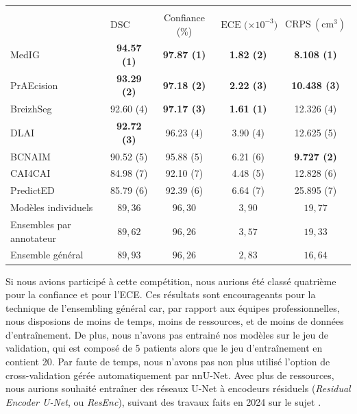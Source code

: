 \documentclass[a4paper,french,bookmarks,12pt]{article}
\begin{document}
    \begin{center}
        \footnotesize
        \begin{NiceTabular}{@{}l c c c c@{}}
        \toprule
         &  \\
         & $\text{DSC (\%)}$ & Confiance (\%) & $\text{ECE ($\times 10^{-3}$)}$ & $\text{CRPS} \ (\mathrm{cm}^3)$ \\
        MedIG & \textbf{94.57 (1)} & \textbf{97.87 (1)} & \textbf{1.82 (2)} & \textbf{8.108 (1)} \\
        PrAEcision & \textbf{93.29 (2)} & \textbf{97.18 (2)} & \textbf{2.22 (3)} & \textbf{10.438 (3)} \\
        BreizhSeg & 92.60 (4) & \textbf{97.17 (3)} & \textbf{1.61 (1)} & 12.326 (4) \\
        DLAI & \textbf{92.72 (3)} & 96.23 (4) & 3.90 (4) & 12.625 (5) \\
        BCNAIM & 90.52 (5) & 95.88 (5) & 6.21 (6) & \textbf{9.727 (2)} \\
        CAI4CAI & 84.98 (7) & 92.10 (7) & 4.48 (5) & 12.828 (6) \\
        PredictED & 85.79 (6) & 92.39 (6) & 6.64 (7) & 25.895 (7) \\[5pt]
        Modèles individuels       & $ 89{,}36$ & $ 96{,}30$ & $ 3{,}90$ & $ 19{,}77$ \\
        Ensembles par annotateur        & $ 89{,}62$ & $ 96{,}26$ & $ 3{,}57$ & $ 19{,}33$ \\
        Ensemble général    & $ 89{,}93$ & $ 96{,}26$ & $ 2{,}83$ & $ 16{,}64$ \\
        \bottomrule
        \end{NiceTabular}
    \end{center}

    Si nous avions participé à cette compétition, nous aurions été classé quatrième pour la confiance et pour l'ECE. Ces résultats sont encourageants pour la technique de l'ensembling général car, par rapport aux équipes professionnelles, nous disposions de moins de temps, moins de ressources, et de moins de données d'entraînement. De plus, nous n'avons pas entrainé nos modèles sur le jeu de validation, qui est composé de 5 patients alors que le jeu d'entraînement en contient 20. Par faute de temps, nous n'avons pas non plus utilisé l'option de cross-validation gérée automatiquement par nnU-Net. Avec plus de ressources, nous aurions souhaité entraîner des réseaux U-Net à encodeurs résiduels (\emph{Residual Encoder U-Net}, ou \emph{ResEnc}), suivant des travaux faits en 2024 sur le sujet \parencite{isensee2024nnunetrevisitedrigorousvalidation}.
\end{document}
